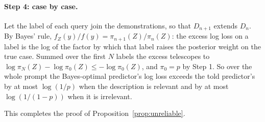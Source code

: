 \documentclass{article}
\begin{document}
\paragraph{Step 4: case by case.}
Let the label of each query join the demonstrations, so that $D_{n+1}$ extends $D_n$. By Bayes' rule, $f_Z(y)/f(y) = \pi_{n+1}(Z)/\pi_n(Z)$: the excess log loss on a label is the log of the factor by which that label raises the posterior weight on the true case. Summed over the first $N$ labels the excess telescopes to $\log \pi_N(Z) - \log \pi_0(Z) \le -\log \pi_0(Z)$, and $\pi_0 = p$ by Step 1. So over the whole prompt the Bayes-optimal predictor's log loss exceeds the told predictor's by at most $\log(1/p)$ when the description is relevant and by at most $\log(1/(1-p))$ when it is irrelevant.

This completes the proof of Proposition~\ref{prop:unreliable}.
\end{document}
